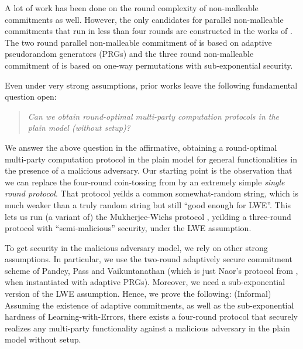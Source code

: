 A lot of work has been done on the round complexity of non-malleable commitments as well. However, the only candidates for parallel non-malleable commitments that run in less than four rounds are constructed in the works of \cite{C:PanPasVai08,C:COSV16}. The two round parallel non-malleable commitment of \cite{C:PanPasVai08} is based on adaptive pseudorandom generators (PRGs) and the three round non-malleable commitment of \cite{C:COSV16} is based on one-way permutations with sub-exponential security.


Even under very strong assumptions, prior works leave the following fundamental question open:
\begin{quote}
\emph{Can we obtain round-optimal multi-party computation protocols in the plain model (without setup)?}
\end{quote}

We answer the above question in the affirmative, obtaining a round-optimal multi-party computation protocol in the plain model for general functionalities in the presence of a malicious adversary. 
Our starting point is the observation that we can replace the four-round coin-tossing from \cite{EC:GMPP16} by an extremely simple \emph{single round protocol}. That protocol yeilds a common somewhat-random string, which is much weaker than a truly random string but still ``good enough for LWE''. This lets us run (a variant of) the Mukherjee-Wichs protocol \cite{MW16}, yeilding a three-round protocol with ``semi-malicious'' security, under the LWE assumption.

To get security in the malicious adversary model, we rely on other strong assumptions. In particular, we use the two-round adaptively secure commitment scheme of Pandey, Pass and Vaikuntanathan \cite{C:PanPasVai08} (which is just Naor's protocol from \cite{JC:Naor91}, when instantiated with adaptive PRGs). Moreover, we need a sub-exponential version of the LWE assumption. Hence, we prove the following:
\BT\label{thm:mpctoken}(Informal)
Assuming the existence of adaptive commitments, as well as the sub-exponential hardness of Learning-with-Errors, there exists a four-round protocol that securely realizes any multi-party functionality against a malicious adversary in the plain model without setup.
\ET

